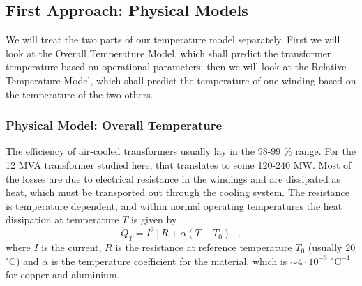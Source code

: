 \documentclass[]{article}
\begin{document}
\subsection{First Approach: Physical Models} \label{sec:physical-model}
We will treat the two parts of our temperature model separately. First we will look at the Overall Temperature Model, which shall predict the transformer temperature based on operational parameters; then we will look at the Relative Temperature Model, which shall predict the temperature of one winding based on the temperature of the two others.

\subsubsection{Physical Model: Overall Temperature} \label{sec:physical-model-overall}
The efficiency of air-cooled transformers usually lay in the 98-99 \% range. For the 12 MVA transformer studied here, that translates to some 120-240 MW. Most of the losses are due to electrical resistance in the windings and are dissipated as heat, which must be transported out through the cooling system. The resistance is temperature dependent, and within normal operating temperatures the heat dissipation at temperature $T$ is given by
\begin{equation}
\dot{Q}_T = I^2 [R + \alpha(T - T_0)],
\end{equation}
where $I$ is the current, $R$ is the resistance at reference temperature $T_0$ (usually 20 $^\circ$C) and $\alpha$ is the temperature coefficient for the material, which is $\sim 4 \cdot 10^{-3}$ $^\circ \text{C}^{-1}$ for copper and aluminium. 
\end{document}
